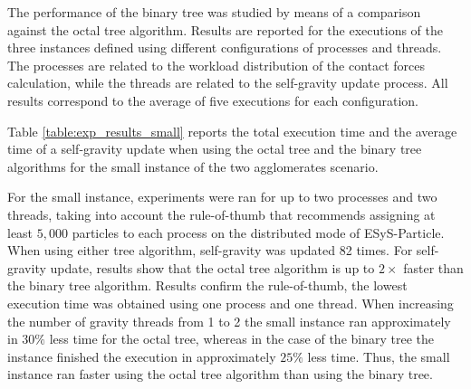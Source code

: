 \documentclass[runningheads]{llncs}
\begin{document}
The performance of the binary tree was studied by means of a comparison against the octal tree algorithm. Results are reported for the executions of the three instances defined using different configurations of processes and threads. The processes are related to the workload distribution of the contact forces calculation, while the threads are related to the self-gravity update process. All results correspond to the average of five executions for each configuration. 

Table \ref{table:exp_results_small} reports the total execution time and the average time of a self-gravity update when using the octal tree and the binary tree algorithms for the small instance of the two agglomerates scenario. 

For the small instance, experiments were ran for up to two processes and two threads, taking into account the rule-of-thumb that recommends assigning at least $5,000$ particles to each process on the distributed mode of ESyS-Particle. When using either tree algorithm, self-gravity was updated 
82 times. For self-gravity update, results show that the octal tree algorithm is up to $2 \times$ faster than the binary tree algorithm. Results confirm the rule-of-thumb, the lowest execution time was obtained using one process and one thread. When increasing the number of gravity threads from 1 to 2 the small instance ran approximately in $30\%$ less time for the octal tree, whereas in the case of the binary tree the instance finished the execution in approximately $25\%$ less time. Thus, the small instance ran faster using the octal tree algorithm than using the binary tree. 
\end{document}
